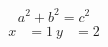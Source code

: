 \documentclass{article}
\begin{document}
\begin{equation} a^2 + b^2 = c^2 \end{equation}
\begin{align} x &= 1 \ y &= 2 \end{align}
\end{document}
